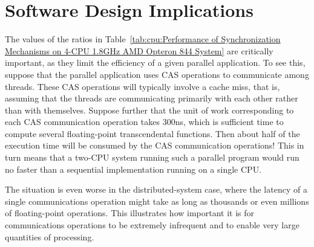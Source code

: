
\section{Software Design Implications}
\label{sec:cpu:Software Design Implications}

The values of the ratios in
Table~\ref{tab:cpu:Performance of Synchronization Mechanisms on 4-CPU 1.8GHz AMD Opteron 844 System}
are critically important, as they limit the
efficiency of a given parallel application.
To see this, suppose that the parallel application uses CAS
operations to communicate among threads.
These CAS operations will typically involve a cache miss, that is, assuming
that the threads are communicating primarily with each other rather than
with themselves.
Suppose further that the unit of work corresponding to each CAS communication
operation takes 300ns, which is sufficient time to compute several
floating-point transcendental functions.
Then about half of the execution time will be consumed by the CAS
communication operations!
This in turn means that a two-CPU system running such a parallel program
would run no faster than a sequential implementation running on a
single CPU.

The situation is even worse in the distributed-system case, where the
latency of a single communications operation might take as long as
thousands or even millions of floating-point operations.
This illustrates how important it is for communications operations to
be extremely infrequent and to enable very large quantities of processing.

